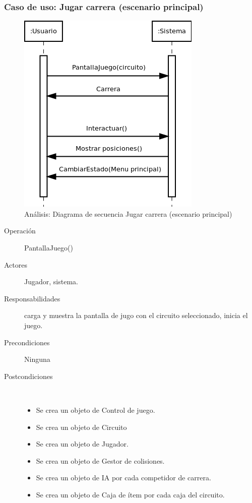 \subsubsection{Caso de uso: Jugar carrera (escenario principal)}

\begin{figure}[H] 
  \label{secuencia_jugar}
  \begin{center}
    \includegraphics[scale=0.7]{imagenes/analisis/secuencia_jugar.png}
  \end{center}
  \caption{Análisis: Diagrama de secuencia Jugar carrera (escenario principal)}
\end{figure}

\begin{description} 
    \item [Operación] PantallaJuego()
    \item [Actores] Jugador, sistema.
    \item [Responsabilidades] carga y muestra la pantalla de jugo con el circuito seleccionado, inicia el juego.
    \item [Precondiciones] Ninguna
    \item [Postcondiciones] $\quad$
        \begin{itemize}
            \item Se crea un objeto de Control de juego.
            \item Se crea un objeto de Circuito
            \item Se crea un objeto de Jugador.
            \item Se crea un objeto de Gestor de colisiones.
            \item Se crea un objeto de IA por cada competidor de carrera.
            \item Se crea un objeto de Caja de ítem por cada caja del circuito.
        \end{itemize}
\end{description}

